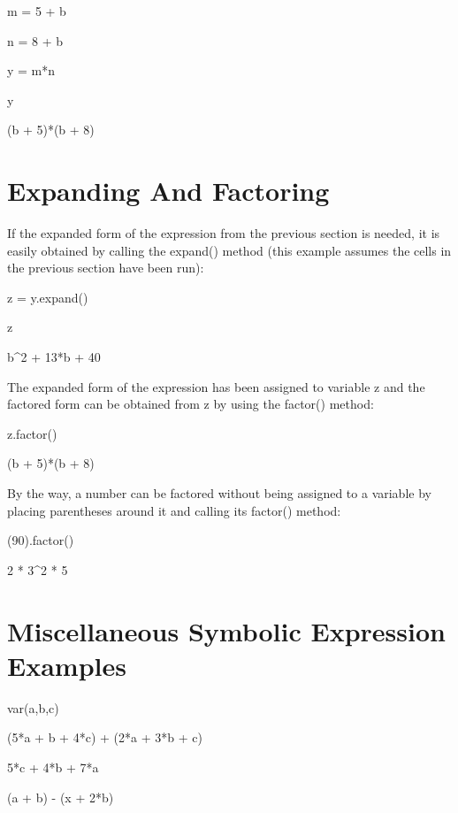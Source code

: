 \documentclass[12pt,twoside]{book}
\begin{document}
\bigskip

m = 5 + b

n = 8 + b

y = m*n

y

{\textbar}

(b + 5)*(b + 8)

\section[Expanding And Factoring]{Expanding And Factoring}

If the expanded form of the expression from the previous section is needed, it is easily obtained by calling the expand() method (this example assumes the cells in the previous section have been run): 

\bigskip

z = y.expand()

z

{\textbar}

b\^{}2 + 13*b + 40

The expanded form of the expression has been assigned to variable z and the factored form can be obtained from z by using the factor() method: 

\bigskip

z.factor()

{\textbar}

(b + 5)*(b + 8)

By the way, a number can be factored without being assigned to a variable by placing parentheses around it and calling its factor() method: 

\bigskip

(90).factor()

{\textbar}

2 * 3\^{}2 * 5

\section[Miscellaneous Symbolic Expression Examples]{ Miscellaneous Symbolic Expression Examples} 

\bigskip

var({\textquotesingle}a,b,c{\textquotesingle})


\bigskip

(5*a + b + 4*c) + (2*a + 3*b + c)

{\textbar}

5*c + 4*b + 7*a

(a + b) {}- (x + 2*b)
\end{document}
